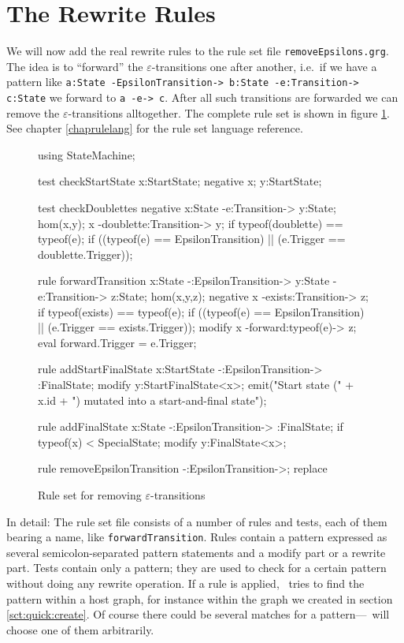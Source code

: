 \section{The Rewrite Rules}
We will now add the real rewrite rules to the rule set file \texttt{removeEpsilons.grg}.
The idea is to ``forward'' the $\varepsilon$-transitions one after another, i.e.\ if we have a pattern like \texttt{a:State -EpsilonTransition-> b:State -e:Transition-> c:State} we forward to \texttt{a -e-> c}.
After all such transitions are forwarded we can remove the $\varepsilon$-transitions alltogether.
The complete rule set is shown in figure \ref{fig:quick:ruleset}.
See chapter \ref{chaprulelang} for the rule set language reference.
\begin{figure}[htbp]
	\centering
	\begin{grgen}
using StateMachine;

test checkStartState {
    x:StartState;
    negative {
        x;
        y:StartState;
    }
}

test checkDoublettes {
    negative {
        x:State -e:Transition-> y:State;
        hom(x,y);
        x -doublette:Transition-> y;
        if {typeof(doublette) == typeof(e);}
        if { ((typeof(e) == EpsilonTransition) || (e.Trigger == doublette.Trigger)); }
    }
}

rule forwardTransition {
    x:State -:EpsilonTransition-> y:State -e:Transition-> z:State;
    hom(x,y,z);
    negative {
        x -exists:Transition-> z;
        if {typeof(exists) == typeof(e);}
        if { ((typeof(e) == EpsilonTransition) || (e.Trigger == exists.Trigger)); }
    }
    modify {
        x -forward:typeof(e)-> z;
        eval {forward.Trigger = e.Trigger;}
    }    
}

rule addStartFinalState {
    x:StartState -:EpsilonTransition-> :FinalState;
    modify {
        y:StartFinalState<x>;
        emit("Start state (" + x.id +  ") mutated into a start-and-final state");
    }
}

rule addFinalState {
    x:State -:EpsilonTransition-> :FinalState;
    if {typeof(x) < SpecialState;}
    modify {
        y:FinalState<x>;
    }
}

rule removeEpsilonTransition {
    -:EpsilonTransition->;
    replace {}   
}	
	\end{grgen}
	\caption{Rule set for removing $\varepsilon$-transitions}
	\label{fig:quick:ruleset}
\end{figure}

In detail: The rule set file consists of a number of rules and tests, each of them bearing a name, like \texttt{forwardTransition}.
Rules contain a pattern expressed as several semicolon-separated pattern statements and a modify part or a rewrite part.
Tests contain only a pattern; they are used to check for a certain pattern without doing any rewrite operation.
If a rule is applied, \GrG\ tries to find the pattern within a host graph, for instance within the graph we created in section \ref{sct:quick:create}.
Of course there could be several matches for a pattern---\GrG\ will choose one of them arbitrarily.

